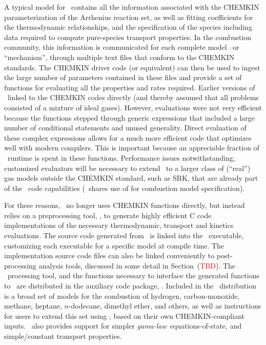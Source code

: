 A typical model for \pelelm\ contains all the information associated with the CHEMKIN parameterization of the Arrhenius reaction set, as well as fitting coefficients for the thermodynamic relationships, and the specification of the species including data required to compute pure-species transport properties. In the combustion community, this information is communicated for each complete model --or ``mechanism'', through multiple text files that conform to the CHEMKIN standards. The CHEMKIN driver code (or equivalent) can then be used to ingest the large number of parameters contained in these files and provide a set of functions for evaluating all the properties and rates required.  Earlier versions of \pelelm\ linked to the CHEMKIN codes directly (and thereby assumed that all problems consisted of a mixture of ideal gases).  However, evaluations were not very efficient because the functions stepped through generic expressions that included a large number of conditional statements and unused generality.  Direct evaluation of these complex expressions allows for a much more efficient code that optimizes well with modern compilers. This is important because an appreciable fraction of \pelelm\ runtime is spent in these functions.  Performance issues notwithstanding, customized evaluators will be necessary to extend \pelelm\ to a larger class of (``real'') gas models outside the CHEMKIN standard, such as SRK, that are already part of the \pelec\ code capabilities (\pelec\ shares use of \pelephysics for combustion model specification).

For these reasons, \pelelm\ no longer uses CHEMKIN functions directly, but instead relies on a preprocessing tool, \fuego, to generate highly efficient C code implementations of the necessary thermodynamic, transport and kinetics evaluations.  The source code generated from \fuego\ is linked into the \pelelm\ executable, customizing each executable for a specific model at compile time.  The implementation source code files can also be linked conveniently to post-processing analysis tools, discussed in some detail in Section~(\textcolor{red}{TBD}). The \fuego\ processing tool, and the functions necessary to interface the generated functions to \pelelm\ are distributed in the auxiliary code package, \pelephysics.  Included in the \pelephysics\ distribution is a broad set of models for the combustion of hydrogen, carbon-monoxide, methane, heptane, $n$-dodecane, dimethyl ether, and others, as well as instructions for users to extend this set using \fuego, based on their own CHEMKIN-compliant inputs. \pelephysics\ also provides support for simpler \textit{gama-law}\ equations-of-state, and simple/constant transport properties.

